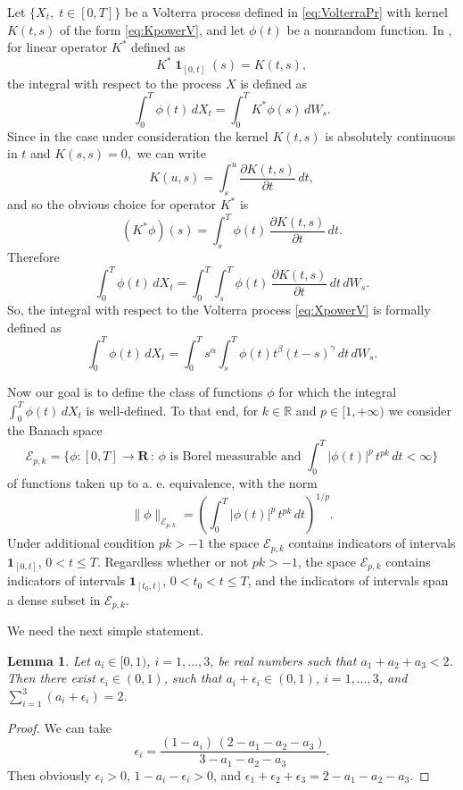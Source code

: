 \documentclass{article}
\DeclareMathOperator{\indicatorfun}{\mathbf{1}}
\def\dKdt(#1,#2){\frac{\partial K(#1,#2)}{\partial #1}}
\theoremstyle{plain}
\newtheorem{lemma}{Lemma}
\theoremstyle{remark}
\theoremstyle{definition}
\begin{document}
Let $\{X_t,\; t\mathbin{\in}[0,T]\}$
be a Volterra process defined in \eqref{eq:VolterraPr}
with kernel $K(t,s)$ of the form \eqref{eq:KpowerV},
and let $\phi(t)$ be a nonrandom function.
In \cite{Nualart2006},
for linear operator $K^*$ defined as
\[
	K^* \indicatorfun_{[0,t]} (s) = K(t,s),
\]
the integral with respect to the process $X$
is defined as
\[
	\int_0^T \phi(t) \, dX_t =
	\int_0^T K^*\phi (s) \, dW_s.
\]
Since in the case under consideration the kernel $K(t,s)$ is absolutely continuous
in $t$ and $K(s,s)=0,$ we can write
\[
	K(u,s) = \int_s^u \dKdt(t, s) \, dt,
\]
and so the obvious choice for operator $K^*$ is
\[
	(K^*\phi) (s) = \int_s^T \phi(t) \, \dKdt(t,s)\, dt.
\]
Therefore
\[
	\int_0^T \phi(t) \, dX_t
	= \int_0^T \int_s^T \phi(t) \, \dKdt(t,s) \, dt \, dW_s .
\]
So, the integral with respect
to the Volterra process \eqref{eq:XpowerV}
is formally defined as
\begin{equation}
	\label{eq:defLPI3Kernel}
\int_0^T \phi(t) \, dX_t = \int_0^T s^\alpha \int_s^T \phi(t) t^\beta (t-s)^\gamma \, dt \, dW_s.
\end{equation}

Now our goal is to define the class of functions $\phi$
for which the integral $\int_0^T \phi(t)\, dX_t$
is well-defined.
To that end, for $k\in  \mathbb{R}$ and $p\in[1,+\infty) $ we consider the Banach space
\[
	\mathcal{E}_{p,k} = \biggl\{\phi : [0,T]\mathbin{\to}
	\mathbf{R} \,:\,
	\mbox{$\phi$ is Borel measurable and~}
	\int_0^T |\phi(t)|^p\, t^{pk} \, dt < \infty\biggr\}
\]
of functions taken up to a. e.\@{} equivalence,
with the norm
\[
	\|\phi\|_{\mathcal{E}_{p,k}}
	= \left( \int_0^T |\phi(t)|^p \, t^{pk} \, dt
	\right)^{1/p} .
\]
Under additional condition $pk>-1$ the space
$\mathcal{E}_{p,k}$ contains indicators of intervals
$\mathbf{1}_{[0,t]}$, $0\mathbin{<}t\mathbin{\le}T$.
Regardless whether or not $pk>-1$,
the space
$\mathcal{E}_{p,k}$ contains indicators of intervals
$\mathbf{1}_{[t_0,t]}$, $0\mathbin{<}t_0\mathbin{<}t\mathbin{\le}T$,
and the indicators of intervals span
a dense subset in $\mathcal{E}_{p,k}$.

We need the next simple statement.

\begin{lemma}\label{lem:X123e3}
Let $a_i\in [0,1)$, $i=1,\ldots,3$,
be real numbers such that $a_1+a_2+a_3<2$.
Then there exist $\epsilon_i\in (0,1)$,
such that $a_i +  \epsilon_i\in(0,1)$,
$i=1,\ldots,3$,
and $\sum_{i=1}^3 (a_i+\epsilon_i) = 2$.
\end{lemma}
\begin{proof}
We can take
\[
\epsilon_i = \frac{(1-a_i) \, (2 - a_1 - a_2 - a_3)}
{3 - a_1 - a_2 - a_3}.
\]
Then  obviously
$\epsilon_i>0$,  $1-a_i-\epsilon_i>0$, and
 $\epsilon_1+\epsilon_2+\epsilon_3
= 2 - a_1 - a_2 -a_3$.
\end{proof}
\end{document}
